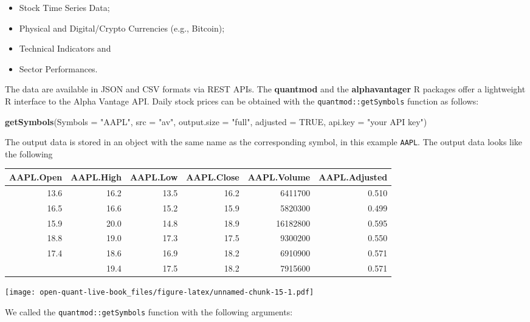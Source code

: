 \documentclass[]{book}
\newenvironment{Shaded}{\begin{snugshade}}{\end{snugshade}}
\newcommand{\KeywordTok}[1]{\textcolor[rgb]{0.13,0.29,0.53}{\textbf{#1}}}
\newcommand{\DataTypeTok}[1]{\textcolor[rgb]{0.13,0.29,0.53}{#1}}
\newcommand{\StringTok}[1]{\textcolor[rgb]{0.31,0.60,0.02}{#1}}
\newcommand{\OtherTok}[1]{\textcolor[rgb]{0.56,0.35,0.01}{#1}}
\newcommand{\NormalTok}[1]{#1}
\providecommand{\tightlist}{%
  \setlength{\itemsep}{0pt}\setlength{\parskip}{0pt}}
\theoremstyle{definition}
\theoremstyle{definition}
\theoremstyle{definition}
\theoremstyle{remark}
\begin{document}
\begin{itemize}
\tightlist
\item
  Stock Time Series Data;
\item
  Physical and Digital/Crypto Currencies (e.g., Bitcoin);
\item
  Technical Indicators and
\item
  Sector Performances.
\end{itemize}

The data are available in JSON and CSV formats via REST APIs. The
\textbf{quantmod} and the \textbf{alphavantager} R packages offer a
lightweight R interface to the Alpha Vantage API. Daily stock prices can
be obtained with the \texttt{quantmod::getSymbols} function as follows:

\begin{Shaded}
\begin{Highlighting}[]
\KeywordTok{getSymbols}\NormalTok{(}\DataTypeTok{Symbols =} \StringTok{"AAPL"}\NormalTok{, }\DataTypeTok{src =} \StringTok{"av"}\NormalTok{, }\DataTypeTok{output.size =} \StringTok{"full"}\NormalTok{, }
  \DataTypeTok{adjusted =} \OtherTok{TRUE}\NormalTok{, }\DataTypeTok{api.key =} \StringTok{"your API key"}\NormalTok{)}
\end{Highlighting}
\end{Shaded}

The output data is stored in an object with the same name as the
corresponding symbol, in this example \texttt{AAPL}. The output data
looks like the following

\begin{tabular}{rrrrrr}
\toprule
AAPL.Open & AAPL.High & AAPL.Low & AAPL.Close & AAPL.Volume & AAPL.Adjusted\\
\midrule
13.6 & 16.2 & 13.5 & 16.2 & 6411700 & 0.510\\
16.5 & 16.6 & 15.2 & 15.9 & 5820300 & 0.499\\
15.9 & 20.0 & 14.8 & 18.9 & 16182800 & 0.595\\
18.8 & 19.0 & 17.3 & 17.5 & 9300200 & 0.550\\
17.4 & 18.6 & 16.9 & 18.2 & 6910900 & 0.571\\
\addlinespace
18.1 & 19.4 & 17.5 & 18.2 & 7915600 & 0.571\\
\bottomrule
\end{tabular}

\texttt{[image: open-quant-live-book\_files/figure-latex/unnamed-chunk-15-1.pdf]}

We called the \texttt{quantmod::getSymbols} function with the following
arguments:
\end{document}
